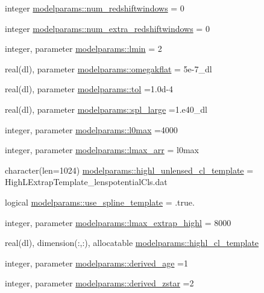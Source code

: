 \begin{DoxyCompactItemize}
\item 
integer \mbox{\hyperlink{namespacemodelparams_a6617a935c25965a12d1cfd1f3a2a3e12}{modelparams\+::num\+\_\+redshiftwindows}} = 0
\item 
integer \mbox{\hyperlink{namespacemodelparams_a9b9513ec2c0807b724060d4cc2b1f209}{modelparams\+::num\+\_\+extra\+\_\+redshiftwindows}} = 0
\item 
integer, parameter \mbox{\hyperlink{namespacemodelparams_ac592a5921d58b2abb1fb48bb520fd87b}{modelparams\+::lmin}} = 2
\item 
real(dl), parameter \mbox{\hyperlink{namespacemodelparams_a1945ea0e00217f55d85995eeae03eb18}{modelparams\+::omegakflat}} = 5e-\/7\+\_\+dl
\item 
real(dl), parameter \mbox{\hyperlink{namespacemodelparams_aa0d6cc3ee9273208296f9f9ee8ce821f}{modelparams\+::tol}} =1.\+0d-\/4
\item 
real(dl), parameter \mbox{\hyperlink{namespacemodelparams_a1385cd79ec8a583c0e723a87e6dd5a78}{modelparams\+::spl\+\_\+large}} =1.e40\+\_\+dl
\item 
integer, parameter \mbox{\hyperlink{namespacemodelparams_af523f2835472798b89ae123214d8fb99}{modelparams\+::l0max}} =4000
\item 
integer, parameter \mbox{\hyperlink{namespacemodelparams_a68d9b09cb50a8117d4eba3f1dc224627}{modelparams\+::lmax\+\_\+arr}} = l0max
\item 
character(len=1024) \mbox{\hyperlink{namespacemodelparams_af0393446db4ef6a4d9b6ea1e107447dd}{modelparams\+::highl\+\_\+unlensed\+\_\+cl\+\_\+template}} = \textquotesingle{}High\+L\+Extrap\+Template\+\_\+lenspotential\+Cls.\+dat\textquotesingle{}
\item 
logical \mbox{\hyperlink{namespacemodelparams_a11a5af696bd0ff15b97767839562048e}{modelparams\+::use\+\_\+spline\+\_\+template}} = .true.
\item 
integer, parameter \mbox{\hyperlink{namespacemodelparams_a773455ee2416a2e08be5835a1c92fccd}{modelparams\+::lmax\+\_\+extrap\+\_\+highl}} = 8000
\item 
real(dl), dimension(\+:,\+:), allocatable \mbox{\hyperlink{namespacemodelparams_ac21d168dd37c9a2ef9fef53a5ba08c3c}{modelparams\+::highl\+\_\+cl\+\_\+template}}
\item 
integer, parameter \mbox{\hyperlink{namespacemodelparams_afcc43d2b71977053be4631323ffeafbc}{modelparams\+::derived\+\_\+age}} =1
\item 
integer, parameter \mbox{\hyperlink{namespacemodelparams_a179ecd2347ad710da08fc22b9d583f02}{modelparams\+::derived\+\_\+zstar}} =2

\end{DoxyCompactItemize}
